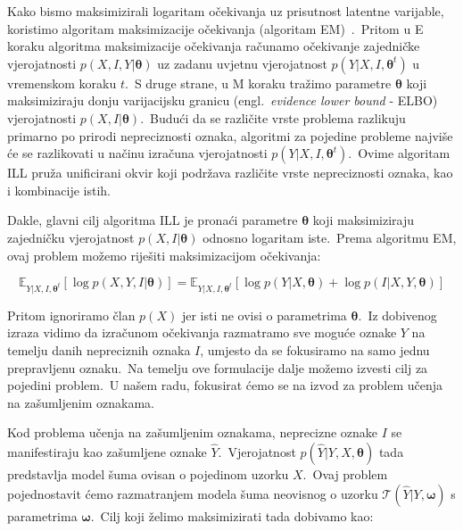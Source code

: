 \documentclass[diplomskirad]{fer}
\begin{document}
Kako bismo maksimizirali logaritam očekivanja uz prisutnost latentne varijable, koristimo algoritam maksimizacije očekivanja (algoritam EM)~\cite{moon1996expectation}.\
Pritom u E koraku algoritma maksimizacije očekivanja računamo očekivanje zajedničke vjerojatnosti $p(X, I, Y | \bm{\theta})$ uz zadanu uvjetnu vjerojatnost $p(Y | X, I, \bm{\theta}^t)$ u vremenskom koraku $t$.\ 
S druge strane, u M koraku tražimo parametre $\bm{\theta}$ koji maksimiziraju donju varijacijsku granicu (engl.\ \textit{evidence lower bound} - ELBO) vjerojatnosti $p(X, I | \bm{\theta})$.\ 
Budući da se različite vrste problema razlikuju primarno po prirodi nepreciznosti oznaka, algoritmi za pojedine probleme najviše će se razlikovati u načinu izračuna vjerojatnosti $p(Y | X, I, \bm{\theta}^t)$.\
Ovime algoritam ILL pruža unificirani okvir koji podržava različite vrste nepreciznosti oznaka, kao i kombinacije istih.\

Dakle, glavni cilj algoritma ILL je pronaći parametre $\bm{\theta}$ koji maksimiziraju zajedničku vjerojatnost $p(X, I | \bm{\theta})$ odnosno logaritam iste.\
Prema algoritmu EM, ovaj problem možemo riješiti maksimizacijom očekivanja:

\begin{equation}
  \mathbb{E}_{Y | X, I, \bm{\theta}^t} \left[ \log p(X, Y, I | \bm{\theta}) \right] = \mathbb{E}_{Y | X, I, \bm{\theta}^t} \left[ \log p(Y | X, \bm{\theta}) + \log p(I | X, Y, \bm{\theta}) \right]
  \label{eq:ill_expectation}
\end{equation}

\pagebreak

Pritom ignoriramo član $p(X)$ jer isti ne ovisi o parametrima $\bm{\theta}$.\ Iz dobivenog izraza vidimo da izračunom očekivanja razmatramo sve moguće oznake $Y$ na temelju danih nepreciznih oznaka $I$, umjesto da se fokusiramo na samo jednu prepravljenu oznaku.\
Na temelju ove formulacije dalje možemo izvesti cilj za pojedini problem.\ U našem radu, fokusirat ćemo se na izvod za problem učenja na zašumljenim oznakama.\ 

Kod problema učenja na zašumljenim oznakama, neprecizne oznake $I$ se manifestiraju kao zašumljene oznake $\hat{Y}$.\ 
Vjerojatnost $p(\hat{Y} | Y, X, \bm{\theta})$ tada predstavlja model šuma ovisan o pojedinom uzorku $X$.\ 
Ovaj problem pojednostavit ćemo razmatranjem modela šuma neovisnog o uzorku $\mathcal{T}(\hat{Y} | Y, \bm{\omega})$ s parametrima $\bm{\omega}$.\ Cilj koji želimo maksimizirati tada dobivamo kao:
\end{document}
